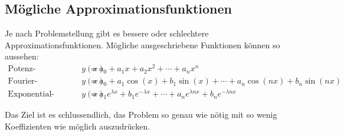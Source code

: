 \subsection{Mögliche Approximationsfunktionen\label{antennen:approxBsp}}

Je nach Problemstellung gibt es bessere oder schlechtere Approximationsfunktionen.
Mögliche ausgeschriebene Funktionen können so aussehen:
\begin{equation}
	\begin{aligned}
		\text{Potenz-Entwicklung: }
		y(x)
		&=
		a_0+a_1 x+a_2 x^2+\cdots+a_n x^n \\
		\text{Fourier-Entwicklung: } 
		y(x)
		&=
		a_0+a_1\cos(x)+b_1\sin(x)+\cdots+a_n\cos(n x)+b_n\sin(n x)\\
		\text{Exponential-Entwicklung: } 
		y(x)
		&=
		a_1 e^{\lambda x}+b_1 e^{-\lambda x}+\cdots+
		a_n e^{\lambda nx}
		+
		b_n e^{-\lambda nx}
	\end{aligned}
\label{antennen:approxFunktBsp}
\end{equation}

Das Ziel ist es schlussendlich, das Problem so genau wie nötig mit so wenig
Koeffizienten wie möglich auszudrücken.

